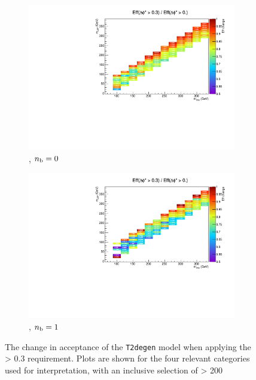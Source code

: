 \begin{figure}[h!]
  \begin{subfigure}[b]{0.46\textwidth}
    \includegraphics[width=\textwidth]
    {Figs/sms/t2degen/v19/eff_changes/eff_compare_2d_T2_4body_v19_vs_T2_4body_v20_eq0b_ge4j}
    \caption{\njhigh, $n_{\text{b}} = 0$}
    \label{fig:t2degen_dphistar_eq0b_ge4j}
  \end{subfigure}
  \begin{subfigure}[b]{0.46\textwidth}
    \includegraphics[width=\textwidth]
    {Figs/sms/t2degen/v19/eff_changes/eff_compare_2d_T2_4body_v19_vs_T2_4body_v20_eq1b_ge4j}
    \caption{\njhigh, $n_{\text{b}} = 1$}
    \label{fig:t2degen_dphistar_eq1b_ge4j}
  \end{subfigure}
  \caption{The change in acceptance of the \texttt{T2degen} model when applying
  the \mindphistar > 0.3 requirement. Plots are shown for the four relevant
  categories used for interpretation, with an inclusive selection of \HT >
  200~\gev}
  \label{fig:t2degen_dphistar_effchange}
\end{figure}

